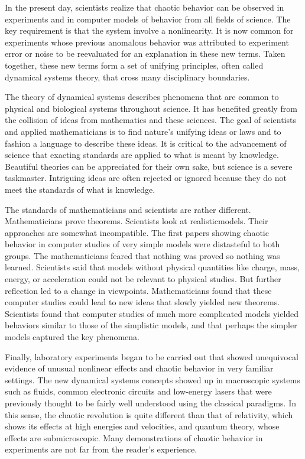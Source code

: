 \documentclass{article}
\begin{document}
In the present day, scientists realize that chaotic behavior can be observed
in experiments and in computer models of behavior from all fields of science. The
key requirement is that the system involve a nonlinearity. It is now common for
experiments whose previous anomalous behavior was attributed to experiment
error or noise to be reevaluated for an explanation in these new terms. Taken
together, these new terms form a set of unifying principles, often called dynamical
systems theory, that cross many disciplinary boundaries.

The theory of dynamical systems describes phenomena that are common
to physical and biological systems throughout science. It has benefited greatly
from the collision of ideas from mathematics and these sciences. The goal of
scientists and applied mathematicians is to find nature’s unifying ideas or laws
and to fashion a language to describe these ideas. It is critical to the advancement
of science that exacting standards are applied to what is meant by knowledge.
Beautiful theories can be appreciated for their own sake, but science is a severe
taskmaster. Intriguing ideas are often rejected or ignored because they do not
meet the standards of what is knowledge.

The standards of mathematicians and scientists are rather different. Mathematicians
prove theorems. Scientists look at realisticmodels. Their approaches are
somewhat incompatible. The first papers showing chaotic behavior in computer
studies of very simple models were distasteful to both groups. The mathematicians
feared that nothing was proved so nothing was learned. Scientists said that models
without physical quantities like charge, mass, energy, or acceleration could not be
relevant to physical studies. But further reflection led to a change in viewpoints.
Mathematicians found that these computer studies could lead to new ideas that
slowly yielded new theorems. Scientists found that computer studies of much more
complicated models yielded behaviors similar to those of the simplistic models,
and that perhaps the simpler models captured the key phenomena.

Finally, laboratory experiments began to be carried out that showed unequivocal
evidence of unusual nonlinear effects and chaotic behavior in very
familiar settings. The new dynamical systems concepts showed up in macroscopic
systems such as fluids, common electronic circuits and low-energy lasers that were
previously thought to be fairly well understood using the classical paradigms. In
this sense, the chaotic revolution is quite different than that of relativity, which
shows its effects at high energies and velocities, and quantum theory, whose effects
are submicroscopic. Many demonstrations of chaotic behavior in experiments are
not far from the reader’s experience.
\end{document}
